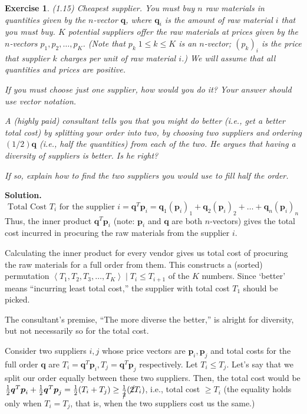 \documentclass[11pt]{book}
\theoremstyle{definition}
\theoremstyle{plain}
\newtheorem{exercise}{Exercise}[chapter]
\theoremstyle{problemstyle}
\theoremstyle{remark}
\theoremstyle{definition}
\begin{document}
\begin{exercise} (1.15) Cheapest supplier. You must buy $n$ raw materials in quantities given by the $n$-vector $\boldsymbol{q}$, where $\boldsymbol{q}_i$ is the amount of raw material $i$ that you must buy. $K$ potential suppliers offer the raw materials at prices given by the $n$-vectors $p_1,p_2,\dots,p_K$. (Note that $p_k\;1\leq k\leq K$ is an $n$-vector; ${(p_k)}_i$ is the price that supplier $k$ charges per unit of raw material $i$.) We will assume that all quantities and prices are positive.

If you must choose just one supplier, how would you do it? Your answer should use vector notation.

    A (highly paid) consultant tells you that you might do better (i.e., get a better total cost) by splitting your order into two, by choosing two suppliers and ordering $(1/2)\boldsymbol{q}$ (i.e., half the quantities) from each of the two. He argues that having a diversity of suppliers is better. Is he right? 

    If so, explain how to find the two suppliers you would use to fill half the order.
\end{exercise}
\textbf{Solution.}
\[
    \text{Total Cost $T_i$ for the supplier $i$}=\boldsymbol{q}^T\boldsymbol{p}_i=\boldsymbol{q}_1(\boldsymbol{p}_i)_1+\boldsymbol{q}_2(\boldsymbol{p}_i)_2+\dots+\boldsymbol{q}_n(\boldsymbol{p}_i)_n
\]
Thus, the inner product $\boldsymbol{q}^T\boldsymbol{p}_i$ (note: $\boldsymbol{p}_i$ and $\boldsymbol{q}$ are both $n$-vectors) gives the total cost incurred in procuring the raw materials from the supplier $i$.

Calculating the inner product for every vendor gives us total cost of procuring the raw materials for a full order from them. This constructs a (sorted) permutation $\left\langle T_1,T_2,T_3,\dots,T_K\right\rangle\mid T_i\leq T_{i+1}$ of the $K$ numbers. Since `better' means ``incurring least total cost,'' the supplier with total cost $T_1$ should be picked.

The consultant's premise, ``The more diverse the better,'' is alright for diversity, but not necessarily so for the total cost.

Consider two suppliers $i,j$ whose price vectors are $\boldsymbol{p}_i,\boldsymbol{p}_j$ and total costs for the full order $\boldsymbol{q}$ are $T_i=\boldsymbol{q}^T\boldsymbol{p}_i,T_j=\boldsymbol{q}^T\boldsymbol{p}_j$ respectively. Let $T_i\leq T_j$. Let's say that we split our order equally between these two suppliers. Then, the total cost would be $\frac{1}{2}\boldsymbol{q}^T\boldsymbol{p}_i+\frac{1}{2}\boldsymbol{q}^T\boldsymbol{p}_j=\frac{1}{2}(T_i+T_j)\geq\frac{1}{\cancel{2}}(\cancel{2}T_i)$, i.e., total cost $\geq T_i$ (the equality holds only when $T_i=T_j$, that is, when the two suppliers cost us the same.)
\end{document}
